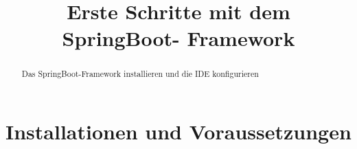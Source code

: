 \documentclass[10pt]{scrartcl}
\title{Erste Schritte mit dem SpringBoot- Framework}
\begin{document}
	\setlength{\droptitle}{-40pt} %
	\maketitle
	
	
	
	
	
	
	\setcounter{page}{1}
	



\begin{abstract}
 Das SpringBoot-Framework installieren und die IDE konfigurieren	
\end{abstract}
\section{Installationen und Voraussetzungen}
\end{document}
